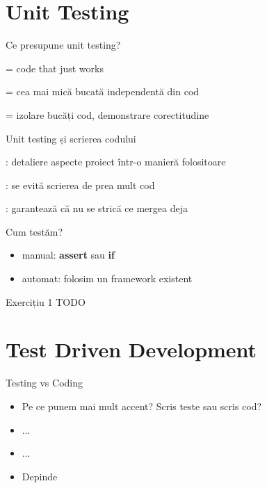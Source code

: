 \documentclass{beamer}
\begin{document}
\section{Unit Testing}

\begin{frame}{Ce presupune unit testing?}
  \begin{description}[<+->]
    \item[garanție]  = code that just works
    \item[unitate] = cea mai mică bucată independentă din cod
    \item[scop] = izolare bucăți cod, demonstrare corectitudine
  \end{description}
\end{frame}

\begin{frame}{Unit testing și scrierea codului}
  \begin{description}[<+->]
    \item[ÎNAINTE] : detaliere aspecte proiect într-o manieră folositoare
    \item[SCRIERE] : se evită scrierea de prea mult cod
    \item[MODIFICARE] : garantează că nu se strică ce mergea deja
  \end{description}
\end{frame}

\begin{frame}{Cum testăm?}
  \begin{itemize}[<+->]
    \item manual: \textbf{assert} sau \textbf{if}
    \item automat: folosim un framework existent
  \end{itemize}
\end{frame}

\begin{frame}{Exercițiu 1}
  TODO
\end{frame}

\section{Test Driven Development}

\begin{frame}{Testing vs Coding}
  \begin{itemize}[<+->]
    \item Pe ce punem mai mult accent? Scris teste sau scris cod?
    \item ...
    \item ...
    \item Depinde
  \end{itemize}
\end{frame}
\end{document}
